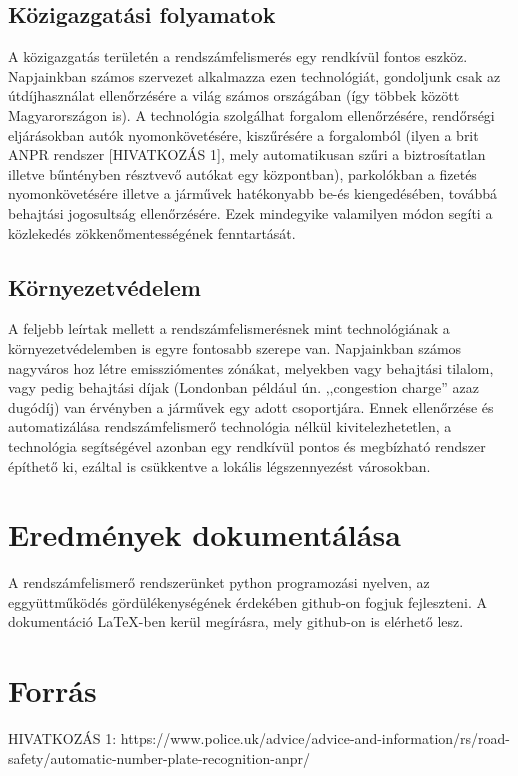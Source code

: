 \documentclass[12pt,a4paper]{article}
\begin{document}
        \subsection{Közigazgatási folyamatok}
            A közigazgatás területén a rendszámfelismerés egy rendkívül fontos eszköz. Napjainkban számos szervezet alkalmazza ezen technológiát, gondoljunk csak az útdíjhasználat ellenőrzésére a világ számos országában (így többek között Magyarországon is). A technológia szolgálhat forgalom ellenőrzésére, rendőrségi eljárásokban autók nyomonkövetésére, kiszűrésére a forgalomból (ilyen a brit ANPR rendszer [HIVATKOZÁS 1], mely automatikusan szűri a biztrosítatlan illetve bűntényben résztvevő autókat egy központban), parkolókban a fizetés nyomonkövetésére illetve a járművek hatékonyabb be-és kiengedésében, továbbá behajtási jogosultság ellenőrzésére. Ezek mindegyike valamilyen módon segíti a közlekedés zökkenőmentességének fenntartását.

        \subsection{Környezetvédelem}
            A feljebb leírtak mellett a rendszámfelismerésnek mint technológiának a környezetvédelemben is egyre fontosabb szerepe van. Napjainkban számos nagyváros hoz létre emissziómentes zónákat, melyekben vagy behajtási tilalom, vagy pedig behajtási díjak (Londonban például ún. ,,congestion charge'' azaz dugódíj) van érvényben a járművek egy adott csoportjára. Ennek ellenőrzése és automatizálása rendszámfelismerő technológia nélkül kivitelezhetetlen, a technológia segítségével azonban egy rendkívül pontos és megbízható rendszer építhető ki, ezáltal is csükkentve a lokális légszennyezést városokban.

    \section{Eredmények dokumentálása}
        A rendszámfelismerő rendszerünket python programozási nyelven, az eggyüttműködés gördülékenységének érdekében github-on fogjuk fejleszteni. A dokumentáció \LaTeX-ben kerül megírásra, mely github-on is elérhető lesz.

    \section{Forrás}

        HIVATKOZÁS 1:
        https://www.police.uk/advice/advice-and-information/rs/road-safety/automatic-number-plate-recognition-anpr/
\end{document}
